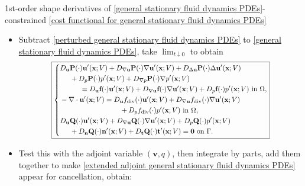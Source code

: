 \documentclass[10pt
hyperref={
    pdfauthor={Hong Quan Ba Nguyen},
    pdftitle={Optimal Shape Design of Air Ducts in Combustion Engines: Design a General Framework},
    pdfsubject={Talk},
    pdfcreator={LaTeX},
}
]{beamer}
\begin{document}
\begin{frame}{1st-order shape derivatives of \eqref{general stationary fluid dynamics PDEs}-constrained \eqref{cost functional for general stationary fluid dynamics PDEs}}
    \begin{itemize}
        \vspace{2mm}
        \item {\footnotesize Subtract \eqref{perturbed general stationary fluid dynamics PDEs} to \eqref{general stationary fluid dynamics PDEs}, take $\lim_{t\downarrow 0}$ to obtain}
        \begin{equation*}
            \scalebox{0.85}{%
            \boxed{\left\{\begin{split}
                &D_{\textbf{u}}\textbf{P}(\cdot)\textbf{u}'(\textbf{x};V) + D_{\nabla\textbf{u}}\textbf{P}(\cdot)\nabla\textbf{u}'(\textbf{x};V) + D_{\Delta\textbf{u}}\textbf{P}(\cdot)\Delta\textbf{u}'(\textbf{x};V)\\
                &\hspace{5mm}+ D_p\textbf{P}(\cdot)p'(\textbf{x};V) + D_{\nabla p}\textbf{P}(\cdot)\nabla p'(\textbf{x};V)\\
                &\hspace{1cm} = D_{\textbf{u}}\textbf{f}(\cdot)\textbf{u}'(\textbf{x};V) + D_{\nabla\textbf{u}}\textbf{f}(\cdot)\nabla\textbf{u}'(\textbf{x};V) + D_p\textbf{f}(\cdot)p'(\textbf{x};V) \mbox{ in } \Omega,\\
                &-\nabla\cdot\textbf{u}'(\textbf{x};V) = D_{\textbf{u}}f_{\rm div}(\cdot)\textbf{u}'(\textbf{x};V) + D_{\nabla\textbf{u}}f_{\rm div}(\cdot)\nabla\textbf{u}'(\textbf{x};V)\\
                &\hspace{3cm}+ D_pf_{\rm div}(\cdot)p'(\textbf{x};V) \mbox{ in } \Omega,\\
                &D_{\textbf{u}}\textbf{Q}(\cdot)\textbf{u}'(\textbf{x};V) + D_{\nabla\textbf{u}}\textbf{Q}(\cdot)\nabla\textbf{u}'(\textbf{x};V) + D_p\textbf{Q}(\cdot)p'(\textbf{x};V)\\
                &\hspace{5mm}+ D_{\textbf{n}}\textbf{Q}(\cdot)\textbf{n}'(\textbf{x};V) + D_{\textbf{t}}\textbf{Q}(\cdot)\textbf{t}'(\textbf{x};V) = {\bf 0} \mbox{ on } \Gamma.
            \end{split}\right.}}
        \end{equation*}
        \item {\footnotesize Test this with the adjoint variable $(\textbf{v},q)$, then integrate by parts, add them together to make \eqref{extended adjoint general stationary fluid dynamics PDEs} appear for cancellation, obtain:}

\end{itemize}
\end{frame}
\end{document}
